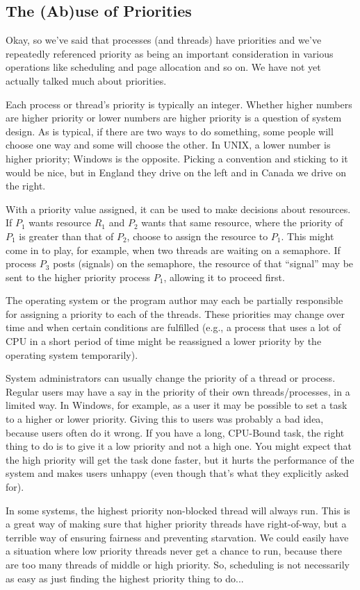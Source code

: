\subsection*{The (Ab)use of Priorities}

Okay, so we've said that processes (and threads) have priorities and we've repeatedly referenced priority as being an important consideration in various operations like scheduling and page allocation and so on. We have not yet actually talked much about priorities.

Each process or thread's priority is typically an integer. Whether higher numbers are higher priority or lower numbers are higher priority is a question of system design. As is typical, if there are two ways to do something, some people will choose one way and some will choose the other. In UNIX, a lower number is higher priority; Windows is the opposite. Picking a convention and sticking to it would be nice, but in England they drive on the left and in Canada we drive on the right.

With a priority value assigned, it can be used to make decisions about resources. If $P_{1}$ wants resource $R_{1}$ and $P_{2}$ wants that same resource, where the priority of $P_{1}$ is greater than that of $P_{2}$, choose to assign the resource to $P_{1}$. This might come in to play, for example, when two threads are waiting on a semaphore. If process $P_{3}$ posts (signals) on the semaphore, the resource of that ``signal'' may be sent to the higher priority process $P_{1}$, allowing it to proceed first.

The operating system or the program author may each be partially responsible for assigning a priority to each of the threads. These priorities may change over time and when certain conditions are fulfilled (e.g., a process that uses a lot of CPU in a short period of time might be reassigned a lower priority by the operating system temporarily).

System administrators can usually change the priority of a thread or process. Regular users may have a say in the priority of their own threads/processes, in a limited way. In Windows, for example, as a user it may be possible to set a task to a higher or lower priority. Giving this to users was probably a bad idea, because users often do it wrong. If you have a long, CPU-Bound task, the right thing to do is to give it a low priority and not a high one. You might expect that the high priority will get the task done faster, but it hurts the performance of the system and makes users unhappy (even though that's what they explicitly asked for).

In some systems, the highest priority non-blocked thread will always run. This is a great way of making sure that higher priority threads have right-of-way, but a terrible way of ensuring fairness and preventing starvation. We could easily have a situation where low priority threads never get a chance to run, because there are too many threads of middle or high priority. So, scheduling is not necessarily as easy as just finding the highest priority thing to do...





